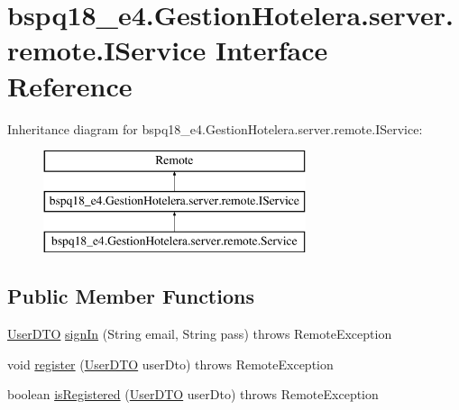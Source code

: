 \hypertarget{interfacebspq18__e4_1_1_gestion_hotelera_1_1server_1_1remote_1_1_i_service}{}\section{bspq18\+\_\+e4.\+Gestion\+Hotelera.\+server.\+remote.\+I\+Service Interface Reference}
\label{interfacebspq18__e4_1_1_gestion_hotelera_1_1server_1_1remote_1_1_i_service}
Inheritance diagram for bspq18\+\_\+e4.\+Gestion\+Hotelera.\+server.\+remote.\+I\+Service\+:\begin{figure}[H]
\begin{center}
\leavevmode
\includegraphics[height=3.000000cm]{interfacebspq18__e4_1_1_gestion_hotelera_1_1server_1_1remote_1_1_i_service}
\end{center}
\end{figure}
\subsection*{Public Member Functions}
\begin{DoxyCompactItemize}
\item 
\mbox{\hyperlink{classbspq18__e4_1_1_gestion_hotelera_1_1server_1_1dto_1_1_user_d_t_o}{User\+D\+TO}} \mbox{\hyperlink{interfacebspq18__e4_1_1_gestion_hotelera_1_1server_1_1remote_1_1_i_service_a8bf5c73858016c112f2c93792f61eec5}{sign\+In}} (String email, String pass)  throws Remote\+Exception
\item 
void \mbox{\hyperlink{interfacebspq18__e4_1_1_gestion_hotelera_1_1server_1_1remote_1_1_i_service_a5a0aab1bc25c952e69cdd451377bf47d}{register}} (\mbox{\hyperlink{classbspq18__e4_1_1_gestion_hotelera_1_1server_1_1dto_1_1_user_d_t_o}{User\+D\+TO}} user\+Dto)  throws Remote\+Exception
\item 
boolean \mbox{\hyperlink{interfacebspq18__e4_1_1_gestion_hotelera_1_1server_1_1remote_1_1_i_service_a10213b1b81f91e9d159f2524625375e6}{is\+Registered}} (\mbox{\hyperlink{classbspq18__e4_1_1_gestion_hotelera_1_1server_1_1dto_1_1_user_d_t_o}{User\+D\+TO}} user\+Dto)  throws Remote\+Exception
\end{DoxyCompactItemize}


